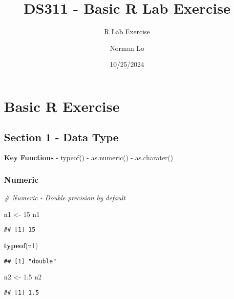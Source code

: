 \documentclass[
]{article}
\title{DS311 - Basic R Lab Exercise}
\subtitle{R Lab Exercise}
\author{Norman Lo}
\date{10/25/2024}
\newenvironment{Shaded}{\begin{snugshade}}{\end{snugshade}}
\newcommand{\CommentTok}[1]{\textcolor[rgb]{0.56,0.35,0.01}{\textit{#1}}}
\newcommand{\DecValTok}[1]{\textcolor[rgb]{0.00,0.00,0.81}{#1}}
\newcommand{\FloatTok}[1]{\textcolor[rgb]{0.00,0.00,0.81}{#1}}
\newcommand{\FunctionTok}[1]{\textcolor[rgb]{0.13,0.29,0.53}{\textbf{#1}}}
\newcommand{\NormalTok}[1]{#1}
\newcommand{\OtherTok}[1]{\textcolor[rgb]{0.56,0.35,0.01}{#1}}
\begin{document}
\maketitle

\section{Basic R Exercise}\label{basic-r-exercise}

\subsection{Section 1 - Data Type}\label{section-1---data-type}

\textbf{Key Functions} - typeof() - as.numeric() - as.charater()

\subsubsection{Numeric}\label{numeric}

\begin{Shaded}
\begin{Highlighting}[]
\CommentTok{\# Numeric {-} Double precision by default}

\NormalTok{n1 }\OtherTok{\textless{}{-}} \DecValTok{15}  
\NormalTok{n1}
\end{Highlighting}
\end{Shaded}

\begin{verbatim}
## [1] 15
\end{verbatim}

\begin{Shaded}
\begin{Highlighting}[]
\FunctionTok{typeof}\NormalTok{(n1)}
\end{Highlighting}
\end{Shaded}

\begin{verbatim}
## [1] "double"
\end{verbatim}

\begin{Shaded}
\begin{Highlighting}[]
\NormalTok{n2 }\OtherTok{\textless{}{-}} \FloatTok{1.5}
\NormalTok{n2}
\end{Highlighting}
\end{Shaded}

\begin{verbatim}
## [1] 1.5
\end{verbatim}
\end{document}
